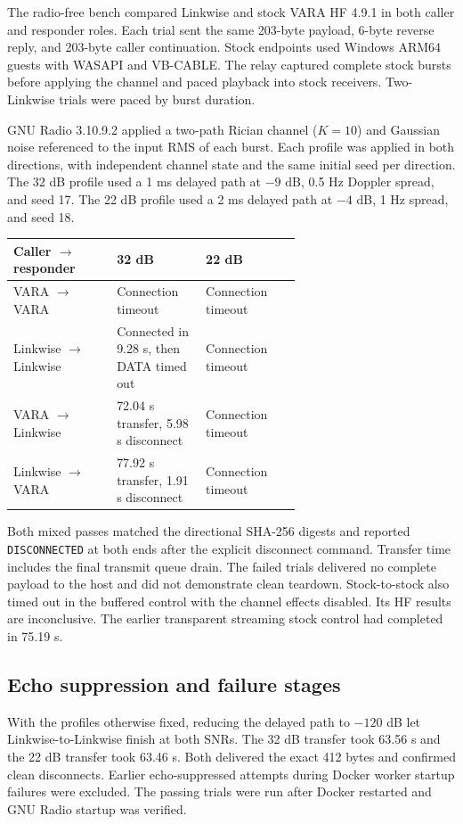 \documentclass[11pt,a4paper]{article}
\begin{document}
The radio-free bench compared Linkwise and stock VARA HF 4.9.1 in both
caller and responder roles. Each trial sent the same 203-byte payload,
6-byte reverse reply, and 203-byte caller continuation. Stock endpoints
used Windows ARM64 guests with WASAPI and VB-CABLE. The relay captured
complete stock bursts before applying the channel and paced playback
into stock receivers. Two-Linkwise trials were paced by burst duration.

GNU Radio 3.10.9.2 applied a two-path Rician channel ($K=10$) and Gaussian
noise referenced to the input RMS of each burst. Each profile was applied
in both directions, with independent channel state and the same initial
seed per direction. The 32 dB profile used a 1 ms delayed path at $-9$ dB,
0.5 Hz Doppler spread, and seed 17. The 22 dB profile used a 2 ms delayed
path at $-4$ dB, 1 Hz spread, and seed 18.

\begin{longtable}{@{}l p{0.31\linewidth} p{0.33\linewidth}@{}}
\toprule
Caller $\to$ responder & 32 dB & 22 dB \\
\midrule
\endhead
VARA $\to$ VARA & Connection timeout & Connection timeout \\
Linkwise $\to$ Linkwise & Connected in 9.28 s, then DATA timed out &
  Connection timeout \\
VARA $\to$ Linkwise & 72.04 s transfer, 5.98 s disconnect &
  Connection timeout \\
Linkwise $\to$ VARA & 77.92 s transfer, 1.91 s disconnect &
  Connection timeout \\
\bottomrule
\end{longtable}

Both mixed passes matched the directional SHA-256 digests and reported
\texttt{DISCONNECTED} at both ends after the explicit disconnect command.
Transfer time includes the final transmit queue drain. The failed trials
delivered no complete payload to the host and did not demonstrate clean
teardown. Stock-to-stock also timed out in the buffered control with the
channel effects disabled. Its HF results are inconclusive. The earlier
transparent streaming stock control had completed in 75.19 s.

\subsection{Echo suppression and failure stages}

With the profiles otherwise fixed, reducing the delayed path to $-120$ dB
let Linkwise-to-Linkwise finish at both SNRs. The 32 dB transfer took
63.56 s and the 22 dB transfer took 63.46 s. Both delivered the exact
412 bytes and confirmed clean disconnects. Earlier echo-suppressed attempts
during Docker worker startup failures were excluded. The passing trials
were run after Docker restarted and GNU Radio startup was verified.
\end{document}
